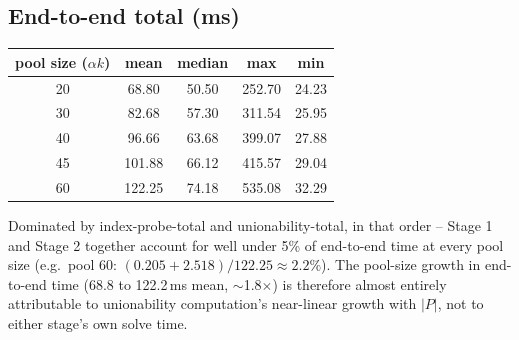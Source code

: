 \subsection{End-to-end total (ms)}
\begin{center}
\begin{tabular}{ccccc}
\toprule
pool size ($\alpha k$) & mean & median & max & min \\
\midrule
20 & 68.80 & 50.50 & 252.70 & 24.23 \\
30 & 82.68 & 57.30 & 311.54 & 25.95 \\
40 & 96.66 & 63.68 & 399.07 & 27.88 \\
45 & 101.88 & 66.12 & 415.57 & 29.04 \\
60 & 122.25 & 74.18 & 535.08 & 32.29 \\
\bottomrule
\end{tabular}
\end{center}
Dominated by index-probe-total and unionability-total, in that order -- Stage 1
and Stage 2 together account for well under 5\% of end-to-end time at every pool
size (e.g.\ pool 60: $(0.205+2.518)/122.25 \approx 2.2\%$). The pool-size growth
in end-to-end time (68.8 to 122.2\,ms mean, $\sim$1.8$\times$) is therefore
almost entirely attributable to unionability computation's near-linear growth
with $|P|$, not to either stage's own solve time.
